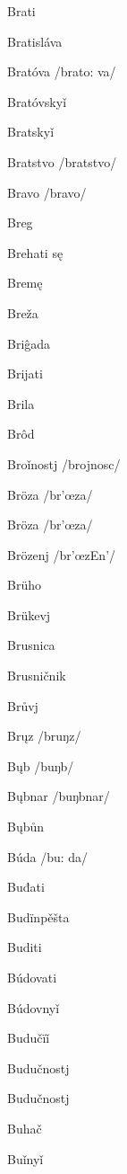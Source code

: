 Brati 

Bratisláva 

Bratóva /brato: va/

Bratóvskyǐ 

Bratskyǐ 

Bratstvo /bratstvo/

Bravo /bravo/

Breg 

Brehati sę 

Bremę 

Breža 

Briĝada 

Brijati 

Brila 

Brôd 

Broǐnostj /brojnosc/

Bröza /br’œza/

Bröza /br’œza/

Brözenj /br’œzEn’/

Brüho 

Brükevj 

Brusnica 

Brusničnik 

Brůvj 

Brųz /bruŋz/

Bųb /buŋb/

Bųbnar /buŋbnar/

Bųbůn 

Búda /bu: da/

Buđati 

Budïnpěšta 

Buditi 

Búdovati 

Búdovnyǐ 

Budučïǐ 

Budučnostj 

Budučnostj 

Buhač 

Buǐnyǐ 

